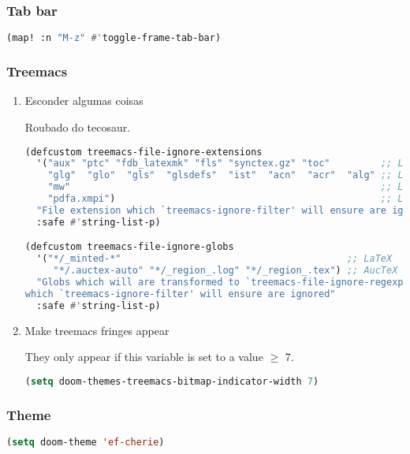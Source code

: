 \documentclass[11pt]{article}
\begin{document}
\subsubsection{Tab bar}
\label{sec:tab-bar}
\begin{lstlisting}[language=Lisp]
(map! :n "M-z" #'toggle-frame-tab-bar)
\end{lstlisting}

\subsubsection{Treemacs}
\label{sec:treemacs}


\begin{enumerate}
  \item Esconder algumas coisas
  \label{sec:esconder-algumas-coisas}

  Roubado do tecosaur.

\begin{lstlisting}[language=Lisp]
(defcustom treemacs-file-ignore-extensions
  '("aux" "ptc" "fdb_latexmk" "fls" "synctex.gz" "toc"         ;; LaTeX
    "glg"  "glo"  "gls"  "glsdefs"  "ist"  "acn"  "acr"  "alg" ;; LaTeX - glossary
    "mw"                                                       ;; LaTeX - pgfplots
    "pdfa.xmpi")                                               ;; LaTeX - pdfx
  "File extension which `treemacs-ignore-filter' will ensure are ignored"
  :safe #'string-list-p)

(defcustom treemacs-file-ignore-globs
  '("*/_minted-*"                                        ;; LaTeX
     "*/.auctex-auto" "*/_region_.log" "*/_region_.tex") ;; AucTeX
  "Globs which will are transformed to `treemacs-file-ignore-regexps'
which `treemacs-ignore-filter' will ensure are ignored"
  :safe #'string-list-p)
\end{lstlisting}
  \item Make treemacs fringes appear
  \label{sec:make-treemacs-fringes-appear}

  They only appear if this variable is set to a value \(\ge\) 7.

\begin{lstlisting}[language=Lisp]
(setq doom-themes-treemacs-bitmap-indicator-width 7)
\end{lstlisting}
\end{enumerate}

\subsubsection{Theme}
\label{sec:theme}
\begin{lstlisting}[language=Lisp]
(setq doom-theme 'ef-cherie)
\end{lstlisting}
\end{document}
